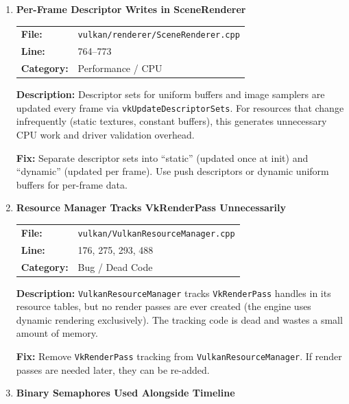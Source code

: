 \documentclass[a4paper,12pt]{article}
\newcommand{\severitybox}[2]{%
  \colorbox{#1}{\makebox[2.5cm][c]{\textcolor{white}{\textbf{#2}}}}%
}
\begin{document}
\begin{enumerate}[leftmargin=*]

\item[\textbf{[P5]}] \textbf{Per-Frame Descriptor Writes in SceneRenderer}
  \hfill \severitybox{lowcolor}{LOW}

  \begin{tabular}{ll}
    \textbf{File:} & \texttt{vulkan/renderer/SceneRenderer.cpp} \\
    \textbf{Line:} & 764--773 \\
    \textbf{Category:} & Performance / CPU \\
  \end{tabular}

  \textbf{Description:}
  Descriptor sets for uniform buffers and image samplers are updated every
  frame via \texttt{vkUpdateDescriptorSets}. For resources that change
  infrequently (static textures, constant buffers), this generates
  unnecessary CPU work and driver validation overhead.

  \textbf{Fix:}
  Separate descriptor sets into ``static'' (updated once at init) and
  ``dynamic'' (updated per frame). Use push descriptors or dynamic
  uniform buffers for per-frame data.

\item[\textbf{[B6]}] \textbf{Resource Manager Tracks VkRenderPass Unnecessarily}
  \hfill \severitybox{lowcolor}{LOW}

  \begin{tabular}{ll}
    \textbf{File:} & \texttt{vulkan/VulkanResourceManager.cpp} \\
    \textbf{Line:} & 176, 275, 293, 488 \\
    \textbf{Category:} & Bug / Dead Code \\
  \end{tabular}

  \textbf{Description:}
  \texttt{VulkanResourceManager} tracks \texttt{VkRenderPass} handles in
  its resource tables, but no render passes are ever created (the engine
  uses dynamic rendering exclusively). The tracking code is dead and
  wastes a small amount of memory.

  \textbf{Fix:}
  Remove \texttt{VkRenderPass} tracking from \texttt{VulkanResourceManager}.
  If render passes are needed later, they can be re-added.

\item[\textbf{[C2]}] \textbf{Binary Semaphores Used Alongside Timeline}
  \hfill \severitybox{lowcolor}{LOW}


\end{enumerate}
\end{document}
